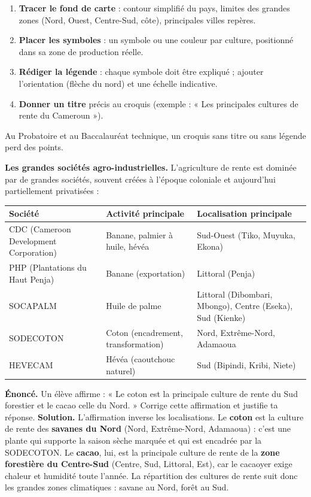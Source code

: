\documentclass[11pt]{article}
\begin{document}
\begin{methode}
\begin{enumerate}
\item \textbf{Tracer le fond de carte} : contour simplifié du pays, limites des grandes zones (Nord, Ouest, Centre-Sud, côte), principales villes repères.
\item \textbf{Placer les symboles} : un symbole ou une couleur par culture, positionné dans sa zone de production réelle.
\item \textbf{Rédiger la légende} : chaque symbole doit être expliqué ; ajouter l'orientation (flèche du nord) et une échelle indicative.
\item \textbf{Donner un titre} précis au croquis (exemple : « Les principales cultures de rente du Cameroun »).
\end{enumerate}
Au Probatoire et au Baccalauréat technique, un croquis sans titre ou sans légende perd des points.
\end{methode}

\textbf{Les grandes sociétés agro-industrielles.} L'agriculture de rente est dominée par de grandes sociétés, souvent créées à l'époque coloniale et aujourd'hui partiellement privatisées :

\begin{center}
\begin{tabularx}{\linewidth}{|l|X|X|}\hline
\rowcolor{popblueL} \textbf{Société} & \textbf{Activité principale} & \textbf{Localisation principale} \\ \hline
CDC (Cameroon Development Corporation) & Banane, palmier à huile, hévéa & Sud-Ouest (Tiko, Muyuka, Ekona) \\ \hline
PHP (Plantations du Haut Penja) & Banane (exportation) & Littoral (Penja) \\ \hline
SOCAPALM & Huile de palme & Littoral (Dibombari, Mbongo), Centre (Eseka), Sud (Kienke) \\ \hline
SODECOTON & Coton (encadrement, transformation) & Nord, Extrême-Nord, Adamaoua \\ \hline
HEVECAM & Hévéa (caoutchouc naturel) & Sud (Bipindi, Kribi, Niete) \\ \hline
\end{tabularx}
\end{center}

\begin{exoresolu}
\textbf{Énoncé.} Un élève affirme : « Le coton est la principale culture de rente du Sud forestier et le cacao celle du Nord. » Corrige cette affirmation et justifie ta réponse.
\tcblower
\textbf{Solution.} L'affirmation inverse les localisations. Le \textbf{coton} est la culture de rente des \textbf{savanes du Nord} (Nord, Extrême-Nord, Adamaoua) : c'est une plante qui supporte la saison sèche marquée et qui est encadrée par la SODECOTON. Le \textbf{cacao}, lui, est la principale culture de rente de la \textbf{zone forestière du Centre-Sud} (Centre, Sud, Littoral, Est), car le cacaoyer exige chaleur et humidité toute l'année. La répartition des cultures de rente suit donc les grandes zones climatiques : savane au Nord, forêt au Sud.
\end{exoresolu}
\end{document}

